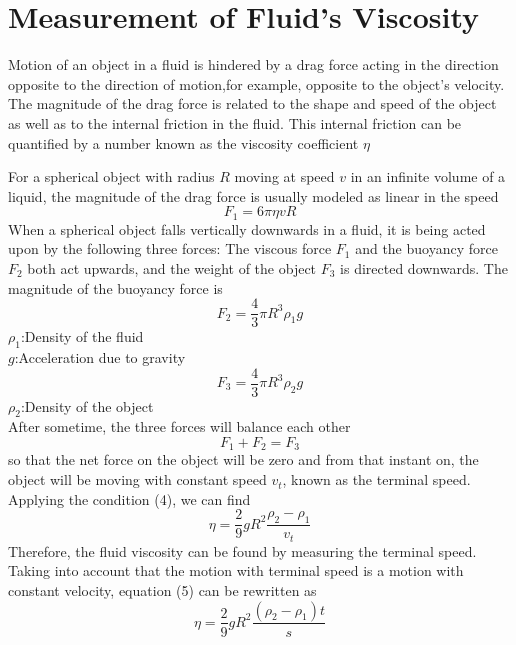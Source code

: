 \documentclass[12pt]{article}
\begin{document}
\section{Measurement of Fluid's Viscosity}
Motion of an object in a fluid is hindered by a drag force acting in the direction opposite to the direction of motion,for example, opposite to the object's velocity. The magnitude of the drag force is related to the shape and speed of the object as well as to the internal friction in the fluid. This internal friction can be quantified by a number known as the viscosity coefficient $\eta$
\par For a spherical object with radius $R$ moving at speed $v$ in an infinite  volume 
of a liquid, the magnitude of the drag force is usually modeled as linear in the speed
\begin{equation}
F_1=6\pi{\eta}vR
\end{equation}
When a spherical object falls vertically downwards in a fluid, it is being acted upon by the following three forces: The viscous force \textbf{$F_1$} and the buoyancy force \textbf{$F_2$} both act upwards, and the weight of the object \textbf{$F_3$} is directed downwards. The magnitude of the buoyancy force is
\begin{equation}
F_2=\frac{4}{3}{\pi}R^3\rho_1g
\end{equation}
{\centering \footnotesize  $\rho_1$:Density of the fluid\\$g$:Acceleration due to gravity\\
}
\begin{equation}
F_3=\frac{4}{3}{\pi}R^3\rho_2g
\end{equation}
{\centering \footnotesize  $\rho_2$:Density of the object\\
}
After sometime, the three forces will balance each other
\begin{equation}
F_1+F_2=F_3	
\end{equation}
so that the net force on the object will be zero and from that instant on, the object will be moving with constant speed $v_t$, known as the terminal speed. Applying the condition (4), we can find
\begin{equation}
\eta=\frac{2}{9}gR^2\frac{\rho_2-\rho_1}{v_t}
\end{equation}
Therefore, the fluid viscosity can be found by measuring the terminal speed. Taking into account that the motion with terminal speed is a motion with constant velocity, equation (5) can be rewritten as
\begin{equation}
\eta=\frac{2}{9}gR^2\frac{(\rho_2-\rho_1)t}{s}
\end{equation}
\end{document}
